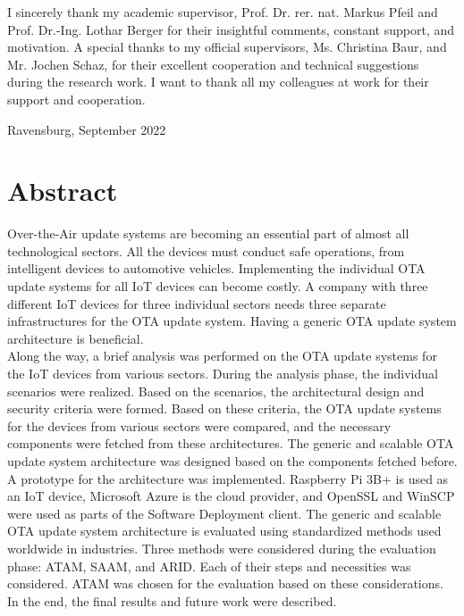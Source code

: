 \documentclass[12pt,a4paper]{article}
\begin{document}
I sincerely thank my academic supervisor, Prof. Dr. rer. nat. Markus Pfeil and Prof. Dr.-Ing. Lothar Berger for their insightful comments, constant support, and motivation. A special thanks to my official supervisors, Ms. Christina Baur, and Mr. Jochen Schaz, for their excellent cooperation and technical suggestions during the research work. I want to thank all my colleagues at work for their support and cooperation. \\

\vspace{3cm}

Ravensburg, September 2022


\newpage
\section*{Abstract}

Over-the-Air update systems are becoming an essential part of almost all technological sectors. All the devices must conduct safe operations, from intelligent devices to automotive vehicles. Implementing the individual OTA update systems for all IoT devices can become costly. A company with three different IoT devices for three individual sectors needs three separate infrastructures for the OTA update system. Having a generic OTA update system architecture is beneficial. \\

Along the way, a brief analysis was performed on the OTA update systems for the IoT devices from various sectors. During the analysis phase, the individual scenarios were realized. Based on the scenarios, the architectural design and security criteria were formed. Based on these criteria, the OTA update systems for the devices from various sectors were compared, and the necessary components were fetched from these architectures. The generic and scalable OTA update system architecture was designed based on the components fetched before. \\

A prototype for the architecture was implemented. Raspberry Pi 3B+ is used as an IoT device, Microsoft Azure is the cloud provider, and OpenSSL and WinSCP were used as parts of the Software Deployment client. The generic and scalable OTA update system architecture is evaluated using standardized methods used worldwide in industries. Three methods were considered during the evaluation phase: ATAM, SAAM, and ARID. Each of their steps and necessities was considered. ATAM was chosen for the evaluation based on these considerations. In the end, the final results and future work were described. \\
\end{document}
